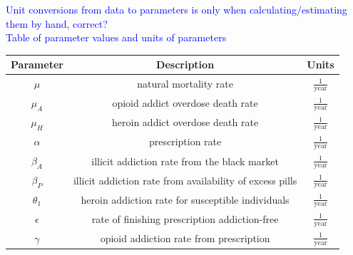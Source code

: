 \documentclass[12pt]{article}
\begin{document}
\pagebreak
\textcolor{blue}{Unit conversions from data to parameters is only when calculating/estimating them by hand, correct?} \\

\textcolor{blue}{Table of parameter values and units of parameters} \\


\begin{center}
 \setlength\extrarowheight{6pt}
\begin{tabular}{|c | c | c | }

 \hline

{Parameter} & {Description} & {Units} \\ [0.5ex]

 \hline\hline
 
 $\mu$ &  natural mortality rate & $\frac{1}{\text{year}}$ \\

 \hline

 $\mu_A$ & opioid addict overdose death rate & $\frac{1}{\text{year}}$\\

 \hline
 
 $\mu_H$ &  heroin addict overdose death rate & $\frac{1}{\text{year}}$ \\

 \hline

$\alpha$ &  prescription rate & $\frac{1}{\text{year}}$    \\

 \hline

$\beta_A$ & illicit addiction rate from the black market & $\frac{1}{\text{year}}$  \\

\hline

$\beta_P$ &  illicit addiction rate from availability of excess pills & $\frac{1}{\text{year}}$  \\

\hline

$\theta_1$&  heroin addiction rate for susceptible individuals & $\frac{1}{\text{year}}$   \\

\hline

$\epsilon$ &  rate of finishing prescription addiction-free & $\frac{1}{\text{year}}$ \\

\hline

$\gamma$ &  opioid addiction rate from prescription & $\frac{1}{\text{year}}$ \\


\end{tabular}
\end{center}
\end{document}
